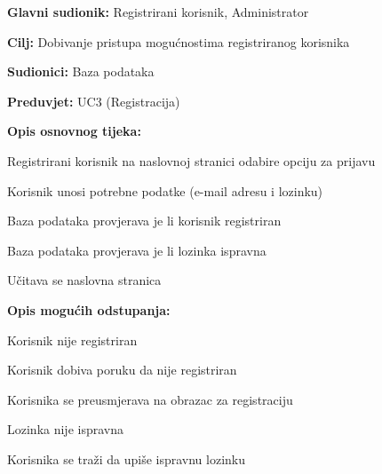 					\noindent {}
					\begin{packed_item}
						
						\item \textbf{Glavni sudionik: }Registrirani korisnik, Administrator
						\item \textbf{Cilj: }Dobivanje pristupa mogućnostima registriranog korisnika
						\item \textbf{Sudionici: }Baza podataka
						\item \textbf{Preduvjet: }UC3 (Registracija)
						\item \textbf{Opis osnovnog tijeka:}
						
						\item[] \begin{packed_enum}
							\item Registrirani korisnik na naslovnoj stranici odabire opciju za prijavu
							\item Korisnik unosi potrebne podatke (e-mail adresu i lozinku)
							\item Baza podataka provjerava je li korisnik registriran
							\item Baza podataka provjerava je li lozinka ispravna
							\item Učitava se naslovna stranica
						\end{packed_enum}
						\item \textbf{Opis mogućih odstupanja:}
						\item[] \begin{packed_enum}
							\item[3.a] Korisnik nije registriran
							\begin{packed_enum}
								\item[1.] Korisnik dobiva poruku da nije registriran
								\item[2.] Korisnika se preusmjerava na obrazac za registraciju
							\end{packed_enum}
							\item[4.a] Lozinka nije ispravna
							\begin{packed_enum}
								\item[1.] Korisnika se traži da upiše ispravnu lozinku
							\end{packed_enum}
						\end{packed_enum}
					\end{packed_item}
					
